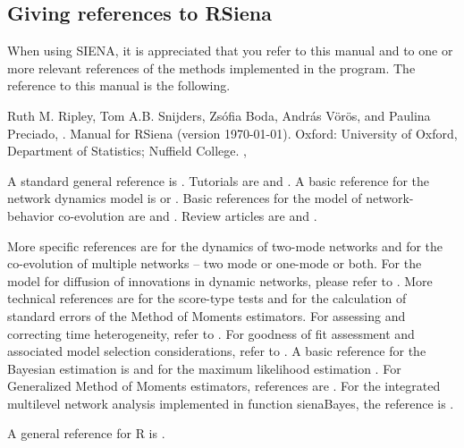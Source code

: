 \documentclass[a4paper,fleqn,11pt]{article}
\newcommand{\+}{\, + \,}
\newcommand{\sfn}[1]{\textsf{#1}}
\newcommand{\R}{{\sf R }}
\newcommand{\si}{{\sf SIENA}}
\begin{document}
\newpage

\subsection{Giving references to RSiena}

When using \si, it is appreciated that you refer to this manual and to one or
more relevant references of the methods implemented in the program.  The
reference to this manual is the following.  \smallskip

\noindent
Ruth M. Ripley, Tom A.B. Snijders, Zs\'{o}fia Boda,
 Andr\'{a}s V\"{o}r\"{o}s, and Paulina Preciado, \the\year.
Manual for RSiena  (version \today).
Oxford: University of Oxford, Department of Statistics; Nuffield College.
{},
\smallskip

A standard general reference is \citet{Snijders2017}.
Tutorials are \citet*{SnijdersEA10b} and \citet{Kalish2020}.
A basic reference for the network dynamics model is \citet{Snijders01}
or \citet{Snijders05}.
Basic references for the model of network-behavior co-evolution
are \citet*{SnijdersEA07} and \citet*{SteglichEA10}.
Review articles are \citet{Snijders2017} and \citet{SnijdersPickup16}.

More specific references are \citet{KoskinenEdling2012} for the
dynamics of two-mode networks and \citet{SLT2013} for the
co-evolution of multiple networks -- two mode or one-mode or both.
For the model for diffusion of innovations in dynamic networks,
please refer to \citet{Greenan15}.
More technical references are
\citet{Schweinberger12} for the score-type tests
and \citet{SchweinbergerSnijders07a} for the calculation of
standard errors of the Method of Moments estimators.
For assessing and correcting time heterogeneity, refer to
\citet*{Lospinoso2011}.
For goodness of fit assessment and associated model
selection considerations, refer to \citet{LospinosoSnijders2019}.
A basic reference for the Bayesian estimation is \citet{KoskinenSnijders07}
and for the maximum likelihood estimation \citet*{SnijdersEA10a}.
For Generalized Method of Moments estimators,
references are \citet*{ASS2015,ASS2019}.
For the integrated multilevel network analysis implemented
in function \sfn{sienaBayes}, the reference is \citet{KoskinenSnijders2022}.
\smallskip

A general reference for \R is \citet{R}.


\newpage
\end{document}
